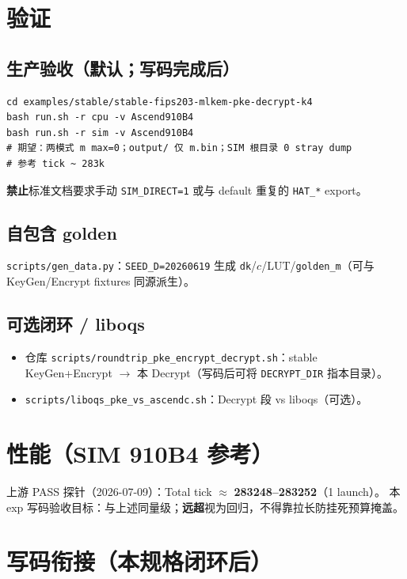 \documentclass[UTF8,a4paper,11pt]{ctexart}
\begin{document}
\section{验证}
\label{sec:verify}

\subsection{生产验收（默认；写码完成后）}

\begin{verbatim}
cd examples/stable/stable-fips203-mlkem-pke-decrypt-k4
bash run.sh -r cpu -v Ascend910B4
bash run.sh -r sim -v Ascend910B4
# 期望：两模式 m max=0；output/ 仅 m.bin；SIM 根目录 0 stray dump
# 参考 tick ~ 283k
\end{verbatim}

\textbf{禁止}标准文档要求手动 \texttt{SIM\_DIRECT=1} 或与 default 重复的 \texttt{HAT\_*} export。

\subsection{自包含 golden}

\texttt{scripts/gen\_data.py}：\texttt{SEED\_D=20260619} 生成 \texttt{dk}/$c$/LUT/\texttt{golden\_m}（可与 KeyGen/Encrypt fixtures 同源派生）。

\subsection{可选闭环 / liboqs}

\begin{itemize}
  \item 仓库 \texttt{scripts/roundtrip\_pke\_encrypt\_decrypt.sh}：stable KeyGen+Encrypt $\to$ 本 Decrypt（写码后可将 \texttt{DECRYPT\_DIR} 指本目录）。
  \item \texttt{scripts/liboqs\_pke\_vs\_ascendc.sh}：Decrypt 段 vs liboqs（可选）。
\end{itemize}

\section{性能（SIM 910B4 参考）}

上游 PASS 探针（2026-07-09）：Total tick $\approx$ \textbf{283248--283252}（1 launch）。
本 exp 写码验收目标：与上述同量级；\textbf{远超}视为回归，不得靠拉长防挂死预算掩盖。

\section{写码衔接（本规格闭环后）}
\end{document}
